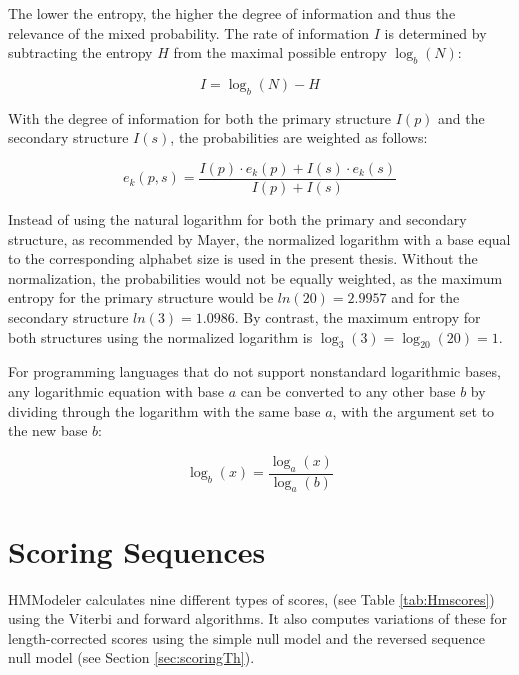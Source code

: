 The lower the entropy, the higher the degree of information and thus the relevance of the mixed probability. The rate of information $I$ is determined by subtracting the entropy $H$ from the maximal possible entropy  $\log_b(N)$:

\begin{equation}
	I = \log_b(N)- H
\end{equation}

With the degree of information for both the primary structure $I(p)$ and the secondary structure $I(s)$, the  probabilities are weighted as follows:

\begin{equation}
	e_k(p,s) = \frac{I(p) \cdot e_k(p) + I(s) \cdot e_k(s)}{I(p)+I(s)}
	\label{eq:shannonfinal}
\end{equation}
 

Instead of using the natural logarithm for both the primary and secondary structure, as recommended by Mayer, the normalized logarithm with a base equal to the corresponding alphabet size is used in the present thesis. Without the normalization, the probabilities would not be equally weighted, as the maximum entropy for the  primary structure would be $ln(20)= 2.9957$ and for the secondary structure  $ ln(3) = 1.0986$. By contrast, the maximum entropy for both structures using the normalized logarithm is $\log_{3}(3)= \log_{20}(20) = 1$.

For programming languages that do not support nonstandard logarithmic bases, any logarithmic equation with base $a$ can be converted to any other base $b$ by dividing through the logarithm with the same base $a$, with the argument set to the new base $b$:


\begin{equation}
	\log_b(x) = \frac{\log_a(x)}{\log_a(b)}
	\label{eq:logBase}
\end{equation}
 
 
\section{Scoring Sequences}
\label{sec:scoring}

HMModeler calculates nine different types of scores, (see Table \ref{tab:Hmscores}) using the Viterbi and forward algorithms. It also computes variations of these for length-corrected scores using the simple null model and the reversed sequence null model (see Section \ref{sec:scoringTh}). 

